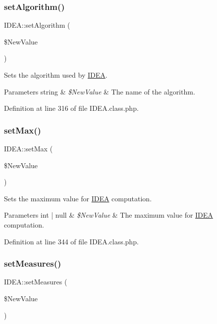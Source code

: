 \subsubsection{\texorpdfstring{set\+Algorithm()}{setAlgorithm()}}
{\footnotesize\ttfamily I\+D\+E\+A\+::set\+Algorithm (\begin{DoxyParamCaption}\item[{}]{\$\+New\+Value }\end{DoxyParamCaption})}

Sets the algorithm used by \hyperlink{class_i_d_e_a}{I\+D\+EA}.


\begin{DoxyParams}[1]{Parameters}
string & {\em \$\+New\+Value} & The name of the algorithm. \\
\hline
\end{DoxyParams}


Definition at line 316 of file I\+D\+E\+A.\+class.\+php.

\mbox{\label{class_i_d_e_a_a9f0c13679c4db79e3eb349779a2d7859}} 
\subsubsection{\texorpdfstring{set\+Max()}{setMax()}}
{\footnotesize\ttfamily I\+D\+E\+A\+::set\+Max (\begin{DoxyParamCaption}\item[{}]{\$\+New\+Value }\end{DoxyParamCaption})}

Sets the maximum value for \hyperlink{class_i_d_e_a}{I\+D\+EA} computation.


\begin{DoxyParams}[1]{Parameters}
int | null & {\em \$\+New\+Value} & The maximum value for \hyperlink{class_i_d_e_a}{I\+D\+EA} computation. \\
\hline
\end{DoxyParams}


Definition at line 344 of file I\+D\+E\+A.\+class.\+php.

\mbox{\label{class_i_d_e_a_ae05dbe1a15345145bb193a9cc859f97a}} 
\subsubsection{\texorpdfstring{set\+Measures()}{setMeasures()}}
{\footnotesize\ttfamily I\+D\+E\+A\+::set\+Measures (\begin{DoxyParamCaption}\item[{}]{\$\+New\+Value }\end{DoxyParamCaption})}

